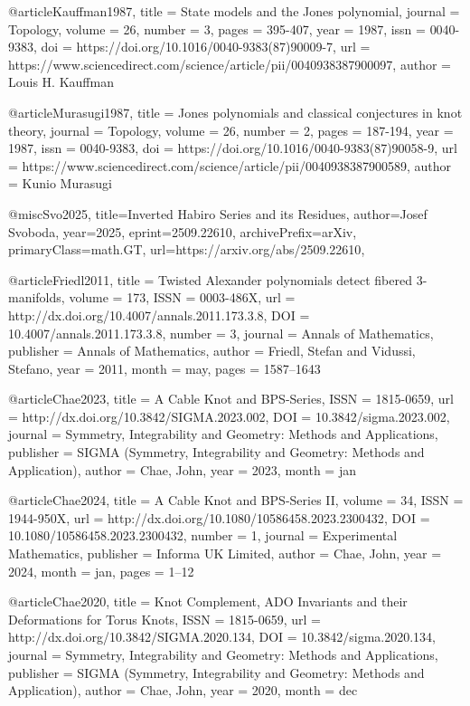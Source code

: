 @article{Kauffman1987,
  title = {State models and the Jones polynomial},
  journal = {Topology},
  volume = {26},
  number = {3},
  pages = {395-407},
  year = {1987},
  issn = {0040-9383},
  doi = {https://doi.org/10.1016/0040-9383(87)90009-7},
  url = {https://www.sciencedirect.com/science/article/pii/0040938387900097},
  author = {Louis {H. Kauffman}}
}

@article{Murasugi1987,
  title = {Jones polynomials and classical conjectures in knot theory},
  journal = {Topology},
  volume = {26},
  number = {2},
  pages = {187-194},
  year = {1987},
  issn = {0040-9383},
  doi = {https://doi.org/10.1016/0040-9383(87)90058-9},
  url = {https://www.sciencedirect.com/science/article/pii/0040938387900589},
  author = {Kunio Murasugi}
}

@misc{Svo2025,
  title={Inverted Habiro Series and its Residues}, 
  author={Josef Svoboda},
  year={2025},
  eprint={2509.22610},
  archivePrefix={arXiv},
  primaryClass={math.GT},
  url={https://arxiv.org/abs/2509.22610}, 
}

@article{Friedl2011,
  title = {Twisted Alexander polynomials detect fibered 3-manifolds},
  volume = {173},
  ISSN = {0003-486X},
  url = {http://dx.doi.org/10.4007/annals.2011.173.3.8},
  DOI = {10.4007/annals.2011.173.3.8},
  number = {3},
  journal = {Annals of Mathematics},
  publisher = {Annals of Mathematics},
  author = {Friedl,  Stefan and Vidussi,  Stefano},
  year = {2011},
  month = may,
  pages = {1587--1643}
}

@article{Chae2023,
  title = {A Cable Knot and {BPS}-Series},
  ISSN = {1815-0659},
  url = {http://dx.doi.org/10.3842/SIGMA.2023.002},
  DOI = {10.3842/sigma.2023.002},
  journal = {Symmetry,  Integrability and Geometry: Methods and Applications},
  publisher = {SIGMA (Symmetry,  Integrability and Geometry: Methods and Application)},
  author = {Chae,  John},
  year = {2023},
  month = jan 
}

@article{Chae2024,
  title = {A Cable Knot and {BPS}-Series {II}},
  volume = {34},
  ISSN = {1944-950X},
  url = {http://dx.doi.org/10.1080/10586458.2023.2300432},
  DOI = {10.1080/10586458.2023.2300432},
  number = {1},
  journal = {Experimental Mathematics},
  publisher = {Informa UK Limited},
  author = {Chae,  John},
  year = {2024},
  month = jan,
  pages = {1--12}
}

@article{Chae2020,
  title = {Knot Complement,  {ADO} Invariants and their Deformations for Torus Knots},
  ISSN = {1815-0659},
  url = {http://dx.doi.org/10.3842/SIGMA.2020.134},
  DOI = {10.3842/sigma.2020.134},
  journal = {Symmetry,  Integrability and Geometry: Methods and Applications},
  publisher = {SIGMA (Symmetry,  Integrability and Geometry: Methods and Application)},
  author = {Chae,  John},
  year = {2020},
  month = dec 
}


